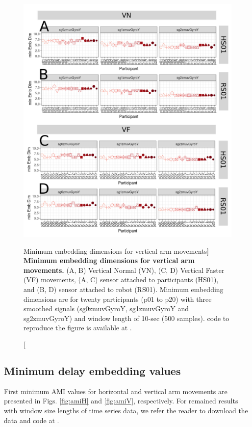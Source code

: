 \begin{figure}
\centering
\includegraphics[width=1.0\textwidth]{cao_aVw10}
	\caption
	[Minimum embedding dimensions for vertical arm movements]{
	{\bf Minimum embedding dimensions for vertical arm movements.} 
		(A, B) Vertical Normal (VN), (C, D) Vertical Faster (VF) 
		movements,
		(A, C) sensor attached to participants (HS01), and		
		(B, D) sensor attached to robot (RS01).
		Minimum embedding dimensions are for twenty participants 
		(p01 to p20) with three smoothed signals (sg0zmuvGyroY, 
		sg1zmuvGyroY and sg2zmuvGyroY) 
		and window length of 10-sec (500 samples).
	\R code to reproduce the figure is available at 
	.
        }
    \label{fig:caoV}
\end{figure}


\newpage
\subsection{Minimum delay embedding values}
First minimum AMI values for horizontal and vertical arm movements
are presented in Figs.  \ref{fig:amiH} and \ref{fig:amiV}, respectively.
For remained  results with window size lengths of time series data, we refer
the reader to download the data and code at \cite{xochicale2018}.

